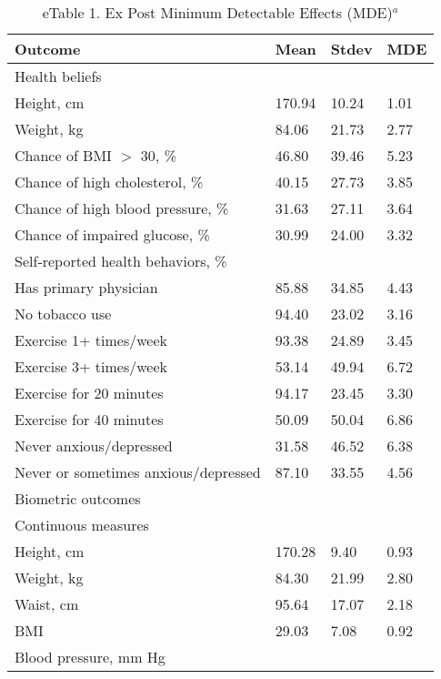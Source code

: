 \documentclass{article}
\begin{document}
\begin{table}[tbp] \centering
{}

\caption{eTable 1. Ex Post Minimum Detectable Effects (MDE)$^{a}$}
{\scriptsize
\begin{tabularx}{\linewidth}{lCCC}

\toprule
Outcome&Mean&Stdev&MDE \tabularnewline
\midrule Health beliefs&&& \tabularnewline
\hspace{1em} Height, cm&170.94&10.24&1.01 \tabularnewline
\hspace{1em} Weight, kg&84.06&21.73&2.77 \tabularnewline
\hspace{1em} Chance of BMI $>$ 30, \%&46.80&39.46&5.23 \tabularnewline
\hspace{1em} Chance of high cholesterol, \%&40.15&27.73&3.85 \tabularnewline
\hspace{1em} Chance of high blood pressure, \%&31.63&27.11&3.64 \tabularnewline
\hspace{1em} Chance of impaired glucose, \%&30.99&24.00&3.32 \tabularnewline
Self‐reported health behaviors, \%&&& \tabularnewline
\hspace{1em} Has primary physician&85.88&34.85&4.43 \tabularnewline
\hspace{1em} No tobacco use&94.40&23.02&3.16 \tabularnewline
\hspace{1em} Exercise 1+ times/week&93.38&24.89&3.45 \tabularnewline
\hspace{1em} Exercise 3+ times/week&53.14&49.94&6.72 \tabularnewline
\hspace{1em} Exercise for 20 minutes&94.17&23.45&3.30 \tabularnewline
\hspace{1em} Exercise for 40 minutes&50.09&50.04&6.86 \tabularnewline
\hspace{1em} Never anxious/depressed&31.58&46.52&6.38 \tabularnewline
\hspace{1em} Never or sometimes anxious/depressed&87.10&33.55&4.56 \tabularnewline
Biometric outcomes&&& \tabularnewline
\hspace{1em} Continuous measures&&& \tabularnewline
\hspace{2em} Height, cm&170.28&9.40&0.93 \tabularnewline
\hspace{2em} Weight, kg&84.30&21.99&2.80 \tabularnewline
\hspace{2em} Waist, cm&95.64&17.07&2.18 \tabularnewline
\hspace{2em} BMI&29.03&7.08&0.92 \tabularnewline
\hspace{2em} Blood pressure, mm Hg&&& \tabularnewline

\end{tabularx}}
\end{table}
\end{document}

